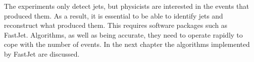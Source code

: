 The experiments only detect jets, but physicists are interested in the events that produced them. As a result, it is essential to be able to identify jets and reconstruct what produced them. This requires software packages such as FastJet. Algorithms, as well as being accurate, they need to operate rapidly to cope with the number of events. In the next chapter the algorithms implemented by FastJet are discussed.


